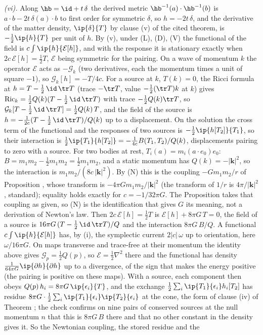 \emph{(vi).} Along $\hb = \id + t\,\delta$ the derived metric $\hb^{-1}(a) \cdot \hb^{-1}(b)$ is $a \cdot b - 2t\,\delta(a) \cdot b$ to first order for symmetric $\delta$, so $h = -2t\,\delta$, and the derivative of the matter density, $\ip{\delta}{T}$ by clause (v) of the cited theorem, is $-\tfrac12\ip{h}{T}$ per unit of $h$. By (v), under (L), (D), (V) the functional of the field is $c\int\ip{h}{\mathcal{E}[h]}$, and with the response it is stationary exactly when $2c\,\mathcal{E}[h] = \tfrac12 T$, $\mathcal{E}$ being symmetric for the pairing. On a wave of momentum $k$ the operator $\mathcal{E}$ acts as $-\mathcal{G}_{k}$ (two derivatives, each the momentum times a unit of square $-1$), so $\mathcal{G}_{k}[h] = -T/4c$. For a source at $k$, $T(k) = 0$, the Ricci formula at $h = T - \tfrac12\,\id\,\tr T$ (trace $-\tr T$, value $-\tfrac12(\tr T)k$ at $k$) gives $\mathrm{Ric}_{k} = \tfrac12 Q(k)(T - \tfrac12\,\id\,\tr T)$ with trace $-\tfrac12 Q(k)\tr T$, so $\mathcal{G}_{k}[T - \tfrac12\,\id\,\tr T] = \tfrac12 Q(k)\,T$, and the field of the source is $h = -\tfrac{1}{2c}(T - \tfrac12\,\id\,\tr T)/Q(k)$ up to a displacement. On the solution the cross term of the functional and the responses of two sources is $-\tfrac12\ip{h[T_{2}]}{T_{1}}$, so their interaction is $\tfrac12\ip{T_{1}}{h[T_{2}]} = -\tfrac{1}{4c}B(T_{1}, T_{2})/Q(k)$, displacements pairing to zero with a source. For two bodies at rest, $T_{i}(a) = m_{i}(a \cdot e_{0})e_{0}$: $B = m_{1}m_{2} - \tfrac12 m_{1}m_{2} = \tfrac12 m_{1}m_{2}$, and a static momentum has $Q(k) = -|\mathbf{k}|^{2}$, so the interaction is $m_{1}m_{2}/(8c\,|\mathbf{k}|^{2})$. By (N) this is the coupling $-Gm_{1}m_{2}/r$ of Proposition , whose transform is $-4\pi G m_{1}m_{2}/|\mathbf{k}|^{2}$ (the transform of $1/r$ is $4\pi/|\mathbf{k}|^{2}$, standard); equality holds exactly for $c = -1/32\pi G$. The Proposition takes that coupling as given, so (N) is the identification that gives $G$ its meaning, not a derivation of Newton's law. Then $2c\,\mathcal{E}[h] = \tfrac12 T$ is $\mathcal{E}[h] + 8\pi G\,T = 0$, the field of a source is $16\pi G\,(T - \tfrac12\,\id\,\tr T)/Q$ and the interaction $8\pi G\,B/Q$. A functional $c\int\ip{h}{\mathcal{E}[h]}$ has, by (i), the symplectic current $2|c|\,\omega$ up to orientation, here $\omega/16\pi G$. On maps transverse and trace-free at their momentum the identity above gives $\mathcal{G}_{p} = \tfrac12 Q(p)$, so $\mathcal{E} = \tfrac12\nabla^{2}$ there and the functional has density $\tfrac{1}{64\pi G}\ip{\partial h}{\partial h}$ up to a divergence, of the sign that makes the energy positive (the pairing is positive on these maps). With a source, each component then obeys $Q(p)\,h_{i} = 8\pi G\,\ip{\epsilon_{i}}{T}$, and the exchange $\tfrac12\sum_{i}\ip{T_{1}}{\epsilon_{i}}h_{i}[T_{2}]$ has residue $8\pi G \cdot \tfrac12\sum_{i}\ip{T_{1}}{\epsilon_{i}}\ip{T_{2}}{\epsilon_{i}}$ at the cone, the form of clause (iv) of Theorem ; the check confirms on nine pairs of conserved sources at the null momentum $n$ that this is $8\pi G\,B$ there and that no other constant in the density gives it. So the Newtonian coupling, the stored residue and the 